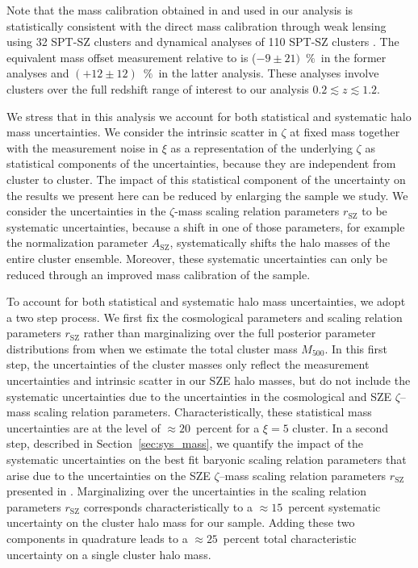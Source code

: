 \documentclass[useAMS,usenatbib,iop,numberedappendix]{mn2e}
\newcommand{\Mfiveoo}{\ensuremath{M_{500}}}
\newcommand{\redshift}{\ensuremath{z}}
\newcommand{\percent}{\ensuremath{\%}}
\begin{document}
Note that the mass calibration obtained in \cite{dehaan16} and used in our analysis is statistically consistent with the direct mass calibration through weak lensing using 32 SPT-SZ clusters \citep{dietrich17} and dynamical analyses of 110 SPT-SZ clusters \citep{capasso17}.   The equivalent mass offset measurement relative to \citet{dehaan16} is ($-9\pm 21)$~\percent\ in the former analyses and $(+12\pm12)$~\percent\ in the latter analysis.  These analyses involve clusters over the full redshift range of interest to our analysis $0.2 \lesssim \redshift \lesssim 1.2$.



We stress that in this analysis we account for both statistical and systematic halo mass uncertainties.  We consider the intrinsic scatter in $\zeta$ at fixed mass together with the measurement noise in $\xi$ as a representation of the underlying $\zeta$ as statistical components of the uncertainties, because they are independent from cluster to cluster.  The impact of this statistical component of the uncertainty on the results we present here can be reduced by enlarging the sample we study. We consider the uncertainties in the $\zeta$-mass scaling relation parameters $r_{\mathrm{SZ}}$ to be systematic uncertainties, because a shift in one of those parameters, for example the normalization parameter $A_\mathrm{SZ}$, systematically shifts the halo masses of the entire cluster ensemble.  Moreover, these systematic uncertainties can only be reduced through an improved mass calibration of the sample.

To account for both statistical and systematic halo mass uncertainties, we adopt a two step process.  We first fix the cosmological parameters and scaling relation parameters $r_{\mathrm{SZ}}$
rather than marginalizing over the full posterior parameter distributions from \citet{dehaan16} when we estimate the total cluster mass \Mfiveoo.   In this first step, the uncertainties of the cluster masses only reflect the measurement uncertainties and intrinsic scatter in our SZE halo masses,  but do not include the systematic uncertainties due to the uncertainties in the cosmological and SZE $\zeta$--mass scaling relation parameters.  Characteristically, these statistical mass uncertainties are at the level of $\approx20$~percent for a $\xi=5$ cluster.
In a second step, described in Section~\ref{sec:sys_mass}, we quantify the impact of the systematic uncertainties on the best fit baryonic scaling relation parameters that arise due to the uncertainties on the SZE $\zeta$--mass scaling relation parameters $r_{\mathrm{SZ}}$ presented in \citet{dehaan16}.  Marginalizing over the uncertainties in the scaling relation parameters $r_{\mathrm{SZ}}$ corresponds characteristically to a  $\approx15$~percent systematic uncertainty on the cluster halo mass for our sample.  Adding these two components in quadrature leads to a $\approx25$~percent total characteristic uncertainty on a single cluster halo mass.
\end{document}
